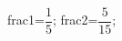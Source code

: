 \documentclass[exercice]{thedocument}%
\begin{document}
%
    \>frac1=$\dfrac15$;%
    \>frac2=$\dfrac5{15}$;%
\end{document}
